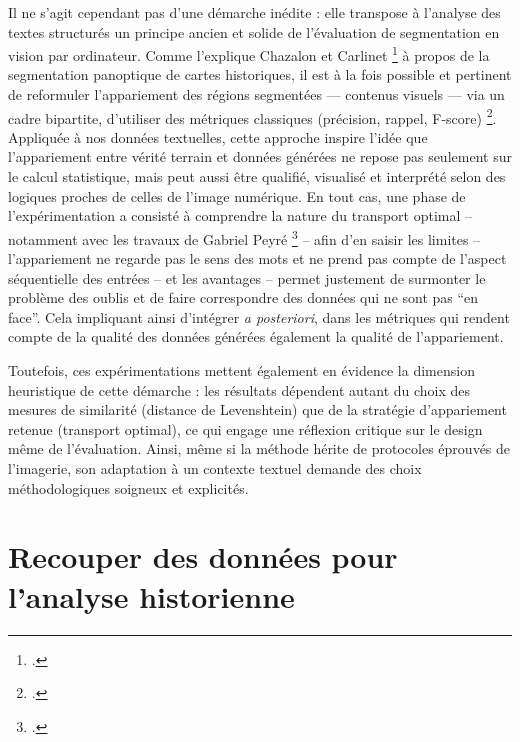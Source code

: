 Il ne s’agit cependant pas d’une démarche inédite : elle transpose à l’analyse des textes structurés un principe ancien et solide de l’évaluation de segmentation en vision par ordinateur. Comme l’explique Chazalon et Carlinet \footcite[][]{chazalon} à propos de la segmentation panoptique de cartes historiques, il est à la fois possible et pertinent de reformuler l’appariement des régions segmentées — contenus visuels — via un cadre bipartite, d’utiliser des métriques classiques (précision, rappel, F-score) \footcite[][]{chazalon}. Appliquée à nos données textuelles, cette approche inspire l’idée que l’appariement entre vérité terrain et données générées ne repose pas seulement sur le calcul statistique, mais peut aussi être qualifié, visualisé et interprété selon des logiques proches de celles de l’image numérique. En tout cas, une phase de l'expérimentation a consisté à comprendre la nature du transport optimal -- notamment avec les travaux de Gabriel Peyré \footcite[][]{peyre} -- afin d'en saisir les limites -- l'appariement ne regarde pas le sens des mots et ne prend pas compte de l'aspect séquentielle des entrées -- et les avantages -- permet justement de surmonter le problème des oublis et de faire correspondre des données qui ne sont pas \enquote{en face}. Cela impliquant ainsi d'intégrer \emph{a posteriori}, dans les métriques qui rendent compte de la qualité des données générées également la qualité de l'appariement.

Toutefois, ces expérimentations mettent également en évidence la dimension heuristique de cette démarche : les résultats dépendent autant du choix des mesures de similarité (distance de Levenshtein) que de la stratégie d’appariement retenue (transport optimal), ce qui engage une réflexion critique sur le design même de l’évaluation. Ainsi, même si la méthode hérite de protocoles éprouvés de l’imagerie, son adaptation à un contexte textuel demande des choix méthodologiques soigneux et explicités.

\section{Recouper des données pour l'analyse historienne}

